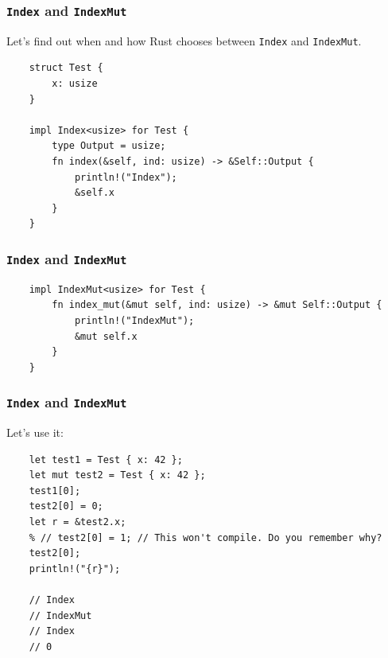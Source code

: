 \documentclass[aspectratio=1610,t]{beamer}
\begin{document}

\begin{frame}[fragile]
\frametitle{\texttt{Index} and \texttt{IndexMut}}
Let's find out when and how Rust chooses between \texttt{Index} and \texttt{IndexMut}.

\begin{verbatim}
    struct Test {
        x: usize
    }

    impl Index<usize> for Test {
        type Output = usize;
        fn index(&self, ind: usize) -> &Self::Output {
            println!("Index");
            &self.x
        }
    }
\end{verbatim}
\end{frame}


\begin{frame}[fragile]
\frametitle{\texttt{Index} and \texttt{IndexMut}}
\begin{verbatim}
    impl IndexMut<usize> for Test {
        fn index_mut(&mut self, ind: usize) -> &mut Self::Output {
            println!("IndexMut");
            &mut self.x
        }
    }
\end{verbatim}
\end{frame}


\begin{frame}[fragile]
\frametitle{\texttt{Index} and \texttt{IndexMut}}
Let's use it:

\begin{verbatim}
    let test1 = Test { x: 42 };
    let mut test2 = Test { x: 42 };
    test1[0];
    test2[0] = 0;
    let r = &test2.x;
    % // test2[0] = 1; // This won't compile. Do you remember why?
    test2[0];
    println!("{r}");

    // Index
    // IndexMut
    // Index
    // 0
\end{verbatim}
\end{frame}

\end{document}

